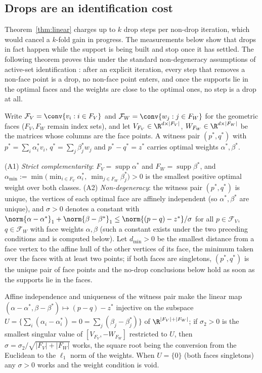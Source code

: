 \subsection{Drops are an identification cost}

Theorem~\ref{thm:linear} charges up to $k$ drop steps per non-drop
iteration, which would cancel a $k$-fold gain in progress. The
measurements below show that drops in fact happen while the support is
being built and stop once it has settled. The following theorem proves
this under the standard non-degeneracy assumptions of active-set
identification \citep{bomze2020,garber2020}: after an explicit
iteration, every step that removes a non-face point is a drop, no
non-face point enters, and once the supports lie in the optimal faces
and the weights are close to the optimal ones, no step is a drop at all.

Write $\mathcal F_V=\conv\{v_i:i\in F_V\}$ and
$\mathcal F_W=\conv\{w_j:j\in F_W\}$ for the geometric faces ($F_V,F_W$
remain index sets), and let $V_{F_V}\in\R^{d\times|F_V|}$,
$W_{F_W}\in\R^{d\times|F_W|}$ be the matrices whose columns are the face
points. A witness pair $(p^*,q^*)$ with $p^*=\sum_i\alpha^*_iv_i$,
$q^*=\sum_j\beta^*_jw_j$ and $p^*-q^*=z^*$ carries optimal weights
$\alpha^*,\beta^*$.
\begin{assumption}\label{ass:nondeg}
(A1) \emph{Strict complementarity}: $F_V=\operatorname{supp}\alpha^*$ and
$F_W=\operatorname{supp}\beta^*$, and
$\alpha_{\min}:=\min\big(\min_{i\in F_V}\alpha^*_i,\ \min_{j\in F_W}\beta^*_j\big)>0$
is the smallest positive optimal weight over both classes. (A2)
\emph{Non-degeneracy}: the witness pair $(p^*,q^*)$ is unique, the
vertices of each optimal face are affinely independent (so
$\alpha^*,\beta^*$ are unique), and $\sigma>0$ denotes a constant with
$\norm{\alpha-\alpha^*}_1+\norm{\beta-\beta^*}_1\le\norm{(p-q)-z^*}/\sigma$
for all $p\in\mathcal F_V$, $q\in\mathcal F_W$ with face weights
$\alpha,\beta$ (such a constant exists under the two preceding
conditions and is computed below). Let $d_{\min}>0$ be the smallest distance from a face
vertex to the affine hull of the other vertices of its face, the minimum
taken over the faces with at least two points; if both faces are
singletons, $(p^*,q^*)$ is the unique pair of face points and the
no-drop conclusions below hold as soon as the supports lie in the faces.
\end{assumption}
Affine independence and uniqueness of the witness pair make the linear
map $(\alpha-\alpha^*,\beta-\beta^*)\mapsto(p-q)-z^*$ injective on the
subspace $U=\{\sum_i(\alpha_i-\alpha^*_i)=0=\sum_j(\beta_j-\beta^*_j)\}$
of $\R^{|F_V|+|F_W|}$; if $\sigma_2>0$ is the smallest singular value of
$[V_{F_V},-W_{F_W}]$ restricted to $U$, then
$\sigma=\sigma_2/\sqrt{|F_V|+|F_W|}$ works, the square root being the
conversion from the Euclidean to the $\ell_1$ norm of the weights. When
$U=\{0\}$ (both faces singletons) any $\sigma>0$ works and the weight
condition is void.


